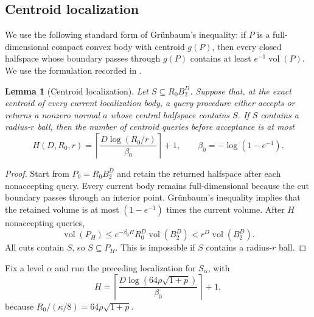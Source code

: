 \documentclass[11pt]{article}
\numberwithin{equation}{section}
\newtheorem{lemma}[lemma]{Lemma}
\theoremstyle{remark}
\theoremstyle{definition}
\newcommand{\Ball}{B_2}
\DeclareMathOperator{\vol}{vol}
\begin{document}
\subsection{Centroid localization}

We use the following standard form of Gr\"unbaum's inequality: if $P$ is a full-dimensional compact convex body with centroid $g(P)$, then every closed halfspace whose boundary passes through $g(P)$ contains at least $e^{-1}\vol(P)$.  We use the formulation recorded in \cite[Lemma 2.2]{bubeck2015}.

\begin{lemma}[Centroid localization]
\label{lem:centroid-localization}
Let $S\subseteq R_0\Ball^D$.  Suppose that, at the exact centroid of every current localization body, a query procedure either accepts or returns a nonzero normal $a$ whose central halfspace contains $S$. If $S$ contains a radius-$r$ ball, then the number of centroid queries before acceptance is at most
\[
H(D,R_0,r)=
\left\lceil
\frac{D\log(R_0/r)}{\beta_0}
\right\rceil+1,
\qquad
\beta_0=-\log(1-e^{-1}).
\]
\end{lemma}

\begin{proof}
Start from $P_0=R_0\Ball^D$ and retain the returned halfspace after each nonaccepting query.  Every current body remains full-dimensional because the cut boundary passes through an interior point.  Gr\"unbaum's inequality implies that the retained volume is at most $(1-e^{-1})$ times the current volume.  After $H$ nonaccepting queries,
\[
\vol(P_H)
\le e^{-\beta_0H}R_0^D\vol(\Ball^D)
<r^D\vol(\Ball^D).
\]
All cuts contain $S$, so $S\subseteq P_H$.  This is impossible if $S$ contains a radius-$r$ ball.
\end{proof}

Fix a level $\alpha$ and run the preceding localization for $S_\alpha$, with
\begin{equation}
H=
\left\lceil
\frac{D\log(64\rho\sqrt{1+p})}{\beta_0}
\right\rceil+1,
\label{eq:H-def}
\end{equation}
because $R_0/(\kappa/8)=64\rho\sqrt{1+p}$.
\end{document}
